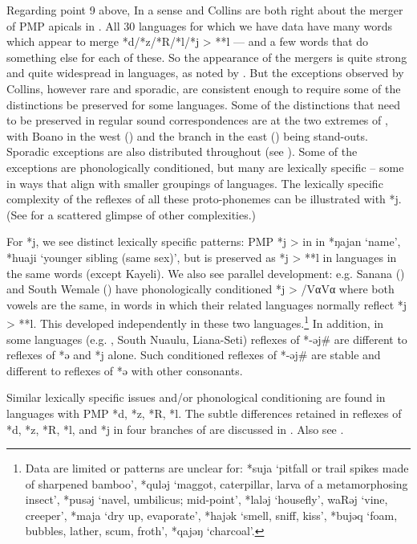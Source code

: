 Regarding point 9 above,
In a sense \citeauthor{Stresemann1927}
and Collins are both right about the merger of PMP apicals in .
All 30  languages for which we have data have
many words which appear to merge *d/*z/*R/*l/*j > **l ---
and a few words that do something else for each of these.
So the appearance of the mergers is quite strong
and quite widespread in  languages,
as noted by \citeauthor{Stresemann1927}.
But the exceptions observed by Collins,
however rare and sporadic, are consistent enough to require some
of the distinctions be preserved for some languages.
Some of the distinctions that need to be preserved in regular
sound correspondences are at the two extremes of ,
with Boano in the west ()
and the  branch in the east () being stand-outs.
Sporadic exceptions are also distributed throughout
 (see  ).
Some of the exceptions are phonologically conditioned,
but many are lexically specific -- some in ways that align with
smaller groupings of languages.
The lexically specific complexity of the reflexes of all these
proto-phonemes can be illustrated with *j.
(See \citet{Collins1983} for a scattered glimpse of other complexities.)

For *j, we see distinct lexically specific patterns: PMP *j >
{\0} in  in *ŋajan ‘name’,
*huaji ‘younger sibling (same sex)’,
but is preserved as *j > **l in  languages in
the same words (except Kayeli).
We also see parallel development: e.g.
Sanana () and South Wemale ()
have phonologically conditioned *j > {\0} /Vα{\gap}Vα where both
vowels are the same,
in words in which their related languages normally reflect *j > **l.
This developed independently in these two languages.\footnote{
		Data are limited or patterns are unclear %
		for: *suja ‘pitfall or trail spikes made of sharpened bamboo’,
		*quləj ‘maggot, caterpillar, larva of a metamorphosing insect’,
		*pusəj ‘navel, umbilicus; mid-point’,
		*laləj ‘housefly’, waRəj ‘vine,
		creeper’, *maja ‘dry up, evaporate’,
		*hajək ‘smell, sniff, kiss’, *bujəq ‘foam, bubbles,
		lather, scum, froth’, *qajəŋ ‘charcoal’.}
In addition,
in some languages (e.g.
, South Nuaulu, Liana-Seti) reflexes of *-əj{\#}
are different to reflexes of *ə and *j alone.
Such conditioned reflexes of *-əj{\#} are stable
and different to reflexes of *ə with other consonants.

Similar lexically specific issues and/or phonological conditioning
are found in  languages with PMP *d, *z, *R, *l.
The subtle differences retained in reflexes of *d,
*z, *R, *l, and *j in four branches of  are
discussed in . Also see \citet{Collins1983}.